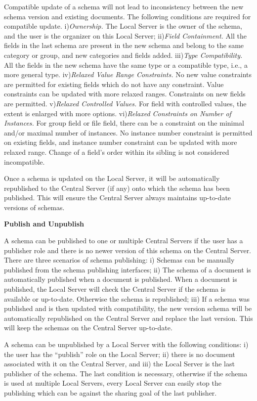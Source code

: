 \documentclass{singlecol-new}
\theoremstyle{TH}{
\newtheorem{lemma}{Lemma}
\newtheorem{theorem}[lemma]{Theorem}
\newtheorem{corrolary}[lemma]{Corrolary}
\newtheorem{conjecture}[lemma]{Conjecture}
\newtheorem{proposition}[lemma]{Proposition}
\newtheorem{claim}[lemma]{Claim}
\newtheorem{stheorem}[lemma]{Wrong Theorem}
\newtheorem{algorithm}{Algorithm}
}
\theoremstyle{THrm}{
\newtheorem{definition}{Definition}[section]
\newtheorem{question}{Question}[section]
\newtheorem{remark}{Remark}
\newtheorem{scheme}{Scheme}
}
\theoremstyle{THhit}{
\newtheorem{case}{Case}[section]
}
\begin{document}
Compatible update of a schema will not lead to inconsistency between
the new schema version and existing documents. The following
conditions are required for compatible update.   i){\em Ownership.}
The Local Server is the owner of the schema, and the user is the
organizer on this Local Server; ii){\em Field Containment.}  All the
fields in the last schema are present in the  new schema and belong
to the same category or group, and new categories and fields added.
iii){\em Type Compatibility.} All the fields in the new schema have
the same type   or a compatible type, i.e., a more general type.
iv){\em Relaxed Value Range Constraints.} No new value constraints
are permitted  for  existing fields which do not have any
constraint. Value constraints can be updated with more relaxed
ranges. Constraints on new fields are permitted. v){\em Relaxed
Controlled Values.} For field with controlled values, the extent is
enlarged with more options. vi){\em Relaxed Constraints on Number of
Instances.} For group field or file field, there can be a constraint
on the minimal and/or maximal number of instances.  No instance
number constraint is permitted on existing fields, and instance
number constraint can be updated with more relaxed range. Change of
a field's order within its sibling is not considered incompatible.


Once a schema is updated on the Local Server, it will be automatically
republished to the Central Server (if any) onto which the schema has been
published. This will ensure the Central Server always maintains up-to-date
versions of schemas.

\textbf{Publish and Unpublish}

A schema can be published to one or multiple Central Servers if the
user has a publisher role and there is no newer version of this
schema on the Central Server.  There are three scenarios of schema
publishing: i) Schemas can be manually  published from the schema
publishing interfaces; ii) The schema of a document is automatically
published when a document is published. When a document is
published, the Local Server will check the Central Server if the
schema is available or up-to-date. Otherwise the schema is
republished; iii) If a schema was published and is then updated with
compatibility, the new version schema will be automatically
republished on the Central  Server and replace the last version.
This will keep the schemas on the  Central Server up-to-date.


A schema can be unpublished by a Local Server with the following conditions:
i) the user has the ``publish'' role on the Local Server; ii) there is no
document associated with it on the Central Server, and iii) the Local Server
is the last publisher of the schema. The last condition is necessary,
otherwise if the schema is used at multiple Local Servers, every Local Server
can easily stop the publishing which can be against the sharing goal of the
last publisher.
\end{document}
